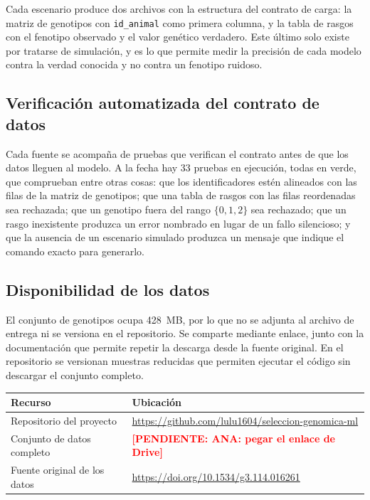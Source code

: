 \documentclass[conference]{IEEEtran}
\newcommand{\pendiente}[1]{\textcolor{red}{\textbf{[PENDIENTE: #1]}}}
\begin{document}
Cada escenario produce dos archivos con la estructura del contrato de
carga: la matriz de genotipos con \texttt{id\_animal} como primera
columna, y la tabla de rasgos con el fenotipo observado y el valor
genético verdadero. Este último solo existe por tratarse de simulación, y
es lo que permite medir la precisión de cada modelo contra la verdad
conocida y no contra un fenotipo ruidoso.

\subsection{Verificación automatizada del contrato de datos}

Cada fuente se acompaña de pruebas que verifican el contrato antes de que
los datos lleguen al modelo. A la fecha hay 33 pruebas en ejecución, todas
en verde, que comprueban entre otras cosas: que los identificadores estén
alineados con las filas de la matriz de genotipos; que una tabla de rasgos
con las filas reordenadas sea rechazada; que un genotipo fuera del rango
$\{0, 1, 2\}$ sea rechazado; que un rasgo inexistente produzca un error
nombrado en lugar de un fallo silencioso; y que la ausencia de un
escenario simulado produzca un mensaje que indique el comando exacto para
generarlo.

\subsection{Disponibilidad de los datos}

El conjunto de genotipos ocupa 428~MB, por lo que no se adjunta al archivo
de entrega ni se versiona en el repositorio. Se comparte mediante enlace,
junto con la documentación que permite repetir la descarga desde la fuente
original. En el repositorio se versionan muestras reducidas que permiten
ejecutar el código sin descargar el conjunto completo.

\begin{center}
\footnotesize
\begin{tabular}{@{}p{2.5cm}p{5.1cm}@{}}
\toprule
\textbf{Recurso} & \textbf{Ubicación} \\
\midrule
Repositorio del proyecto &
  \url{https://github.com/lulu1604/seleccion-genomica-ml} \\[2pt]
Conjunto de datos completo &
  \pendiente{ANA: pegar el enlace de Drive} \\[2pt]
Fuente original de los datos &
  \url{https://doi.org/10.1534/g3.114.016261} \\
\bottomrule
\end{tabular}
\end{center}
\end{document}
